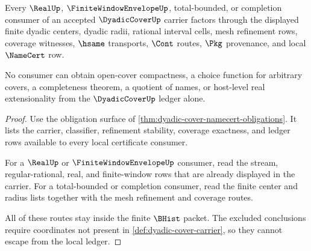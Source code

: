 \begin{theorem}
\label{thm:dyadic-cover-ledger-nonescape}
Every $\RealUp$, $\FiniteWindowEnvelopeUp$, total-bounded, or completion
consumer of an accepted $\DyadicCoverUp$ carrier factors through the displayed
finite dyadic centers, dyadic radii, rational interval cells, mesh refinement
rows, coverage witnesses, $\hsame$ transports, $\Cont$ routes, $\Pkg$
provenance, and local $\NameCert$ row.

No consumer can obtain open-cover compactness, a choice function for arbitrary
covers, a completeness theorem, a quotient of names, or host-level real
extensionality from the $\DyadicCoverUp$ ledger alone.
\end{theorem}
\begin{proof}
Use the obligation surface of
\autoref{thm:dyadic-cover-namecert-obligations}. It lists the carrier,
classifier, refinement stability, coverage exactness, and ledger rows
available to every local certificate consumer.

For a $\RealUp$ or $\FiniteWindowEnvelopeUp$ consumer, read the stream,
regular-rational, real, and finite-window rows that are already displayed in
the carrier. For a total-bounded or completion consumer, read the finite center
and radius lists together with the mesh refinement and coverage routes.

All of these routes stay inside the finite $\BHist$ packet. The excluded
conclusions require coordinates not present in
\autoref{def:dyadic-cover-carrier}, so they cannot escape from the local
ledger.
\end{proof}

